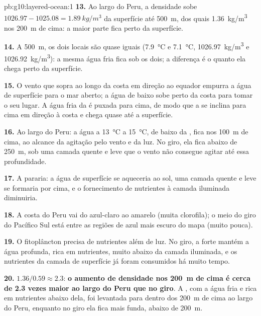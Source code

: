 \begin{solution}{pb:g10:layered-ocean:1}
\textbf{13.} Ao largo do Peru, a densidade sobe $1026.97 - 1025.08 =
\qty{1.89}{kg/m^3}$ da superfície até \qty{500}{m}, dos quais
\qty{1.36}{kg/m^3} nos \qty{200}{m} de cima: a maior parte fica perto da
superfície.

\textbf{14.} A \qty{500}{m}, os dois locais são quase iguais
(\qty{7.9}{\degreeCelsius} e \qty{7.1}{\degreeCelsius},
\qty{1026.97}{kg/m^3} e \qty{1026.92}{kg/m^3}): a mesma água fria fica sob
os dois; a diferença é o quanto ela chega perto da superfície.

\textbf{15.} O vento que sopra ao longo da costa em direção ao equador
empurra a água de superfície para o mar aberto; a água de baixo sobe perto
da costa para tomar o seu lugar. A água fria da  é puxada para
cima, de modo que a  se inclina para cima em direção à costa e
chega quase até a superfície.

\textbf{16.} Ao largo do Peru: a água a \qty{13}{\degreeCelsius} a
\qty{15}{\degreeCelsius}, de baixo da , fica nos \qty{100}{m} de
cima, ao alcance da agitação pelo vento e da luz. No giro, ela fica abaixo
de \qty{250}{m}, sob uma camada quente e leve que o vento não consegue
agitar até essa profundidade.

\textbf{17.} A  pararia: a água de superfície se aqueceria ao
sol, uma camada quente e leve se formaria por cima, e o fornecimento de
nutrientes à camada iluminada diminuiria.

\textbf{18.} A costa do Peru vai do azul-claro ao amarelo (muita clorofila);
o meio do giro do Pacífico Sul está entre as regiões de azul mais escuro do
mapa (muito pouca).

\textbf{19.} O fitoplâncton precisa de nutrientes além de luz. No giro, a
forte  mantém a água profunda, rica em nutrientes, muito
abaixo da camada iluminada, e os nutrientes da camada de superfície já foram
consumidos há muito tempo.

\textbf{20.} $1.36/0.59 \approx 2.3$: \textbf{o aumento de densidade nos
\qty{200}{m} de cima é cerca de 2.3 vezes maior ao largo do Peru que no
giro}. A , com a água fria e rica em nutrientes abaixo dela, foi
levantada para dentro dos \qty{200}{m} de cima ao largo do Peru, enquanto no
giro ela fica mais funda, abaixo de \qty{200}{m}.
\end{solution}
